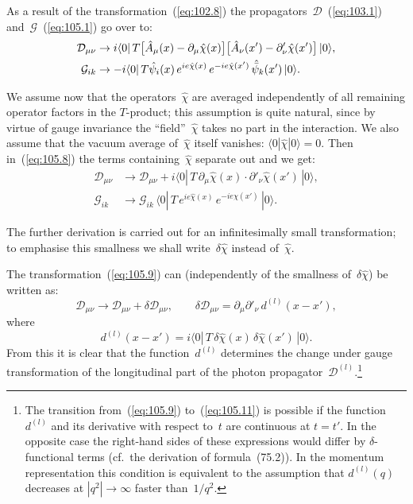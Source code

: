 As a result of the transformation~(\ref{eq:102.8}) the propagators~$\mathcal{D}$~(\ref{eq:103.1}) and~$\mathcal{G}$~(\ref{eq:105.1}) go over to:
\begin{align}
\mathcal{D}_{\mu\nu} &\to i\langle 0|\,T\bigl[\hat{A}_\mu(x) - \partial_\mu\hat{\chi}(x)\bigr]\bigl[\hat{A}_\nu(x') - \partial'_\nu\hat{\chi}(x')\bigr]\,|0\rangle, \label{eq:105.8} \\
\mathcal{G}_{ik} &\to -i\langle 0|\,T\hat{\psi}_i(x)\,e^{ie\hat{\chi}(x)}\,e^{-ie\hat{\chi}(x')}\,\hat{\bar{\psi}}_k(x')\,|0\rangle. \notag
\end{align}


We assume now that the operators~$\hat{\chi}$ are averaged independently of all remaining operator factors in the $T$-product; this assumption is quite natural, since by virtue of gauge invariance the ``field''~$\hat{\chi}$ takes no part in the interaction. We also assume that the vacuum average of~$\hat{\chi}$ itself vanishes: $\langle 0|\hat{\chi}|0\rangle = 0$. Then in~(\ref{eq:105.8}) the terms containing~$\hat{\chi}$ separate out and we get:
\begin{align}
\mathcal{D}_{\mu\nu} &\to \mathcal{D}_{\mu\nu} + i\langle 0|\,T\,\partial_\mu\hat{\chi}(x)\cdot\partial'_\nu\hat{\chi}(x')\,|0\rangle, \label{eq:105.9} \\
\mathcal{G}_{ik} &\to \mathcal{G}_{ik}\,\langle 0|\,T\,e^{ie\hat{\chi}(x)}\,e^{-ie\hat{\chi}(x')}\,|0\rangle. \label{eq:105.10}
\end{align}

The further derivation is carried out for an infinitesimally small transformation; to emphasise this smallness we shall write~$\delta\hat{\chi}$ instead of~$\hat{\chi}$.

The transformation~(\ref{eq:105.9}) can (independently of the smallness of~$\delta\hat{\chi}$) be written as:
\begin{equation}
\mathcal{D}_{\mu\nu} \to \mathcal{D}_{\mu\nu} + \delta\mathcal{D}_{\mu\nu}, \qquad \delta\mathcal{D}_{\mu\nu} = \partial_\mu\partial'_\nu\,d^{(l)}(x - x'),
\label{eq:105.11}
\end{equation}
where
\begin{equation}
d^{(l)}(x - x') = i\langle 0|\,T\,\delta\hat{\chi}(x)\,\delta\hat{\chi}(x')\,|0\rangle.
\label{eq:105.12}
\end{equation}
From this it is clear that the function~$d^{(l)}$ determines the change under gauge transformation of the longitudinal part of the photon propagator~$\mathcal{D}^{(l)}$.\footnote{The transition from~(\ref{eq:105.9}) to~(\ref{eq:105.11}) is possible if the function~$d^{(l)}$ and its derivative with respect to~$t$ are continuous at $t = t'$. In the opposite case the right-hand sides of these expressions would differ by $\delta$-functional terms (cf.\ the derivation of formula~(75.2)). In the momentum representation this condition is equivalent to the assumption that $d^{(l)}(q)$ decreases at $|q^2| \to \infty$ faster than~$1/q^2$.}

